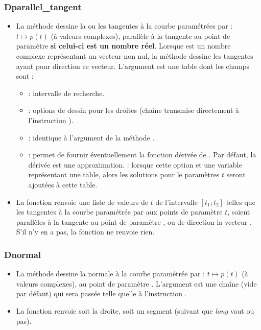 \subsubsection{Dparallel\_tangent}
\begin{itemize}
    \item La méthode  dessine la ou les tangentes à la courbe paramétrées par : \(t \mapsto p(t)\) (à valeurs complexes), parallèle à la tangente au point de paramètre  \textbf{si celui-ci est un nombre réel}. Lorsque  est un nombre complexe représentant un vecteur non nul, la méthode dessine les tangentes ayant pour direction ce vecteur. L'argument  est une table dont les champs sont :
    \begin{itemize}
        \item {} : intervalle de recherche.
        \item {} : options de dessin pour les droites (chaîne transmise directement à l'instruction \drawcmd).
        \item {} : identique à l'argument  de la méthode .
        \item {} : permet de fournir éventuellement la fonction dérivée de . Par défaut, la dérivée est une approximation.
         : lorsque cette option et une variable représentant une table, alors les solutions pour le paramètres $t$ seront ajoutées à cette table.
    \end{itemize}

    \item La fonction  renvoie une liste de valeurs de $t$ de l'intervalle $[t_1;t_2]$ telles que les tangentes à la courbe paramétrée par  aux points de paramètre $t$, soient parallèles à la tangente au point de paramètre , ou de direction la vecteur . S'il n'y en a pas, la fonction ne renvoie rien.
\end{itemize}


\subsubsection{Dnormal}
\begin{itemize}
    \item La méthode  dessine la normale à la courbe paramétrée par : \(t \mapsto p(t)\) (à valeurs complexes), au point de paramètre . \arguLong{} L'argument  est une chaîne (vide par défaut) qui sera passée telle quelle à l'instruction \drawcmd.
    \item La fonction  renvoie soit la droite, soit un segment (suivant que \emph{long} vaut \nil ou pas).
\end{itemize}

